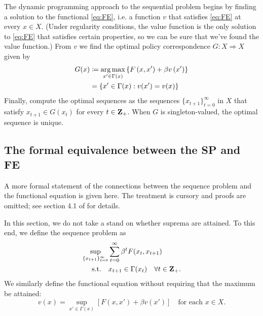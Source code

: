 \documentclass[11pt,letterpaper,reqno,oneside]{article}
\begin{document}
The dynamic programming approach to the sequential problem begins by finding a solution to the functional \cref{eq:FE}, i.e. a function $v$ that satisfies \eqref{eq:FE} at every $x \in X$. (Under regularity conditions, the value function is the only solution to \eqref{eq:FE} that satisfies certain properties, so we can be sure that we've found the value function.) From $v$ we find the optimal policy correspondence $G : X \Rightarrow X$ given by
%
\begin{align}
	G(x)
	&\coloneqq \operatorname*{arg\,max}_{ x' \in \Gamma(x) } 
	\left\{ F \left( x, x' \right) + \beta v \left( x' \right) \right\} 
	\nonumber \\
	&= \left\{ x' \in \Gamma(x) : v(x') = v(x) \right\}
	\label{eq:policy_fn}
\end{align}
%
Finally, compute the optimal sequences as the sequences $\{ x_{t+1} \}_{t=0}^\infty$ in $X$ that satisfy $x_{t+1} \in G( x_t )$ for every $t \in \mathbf{Z}_+$. When $G$ is singleton-valued, the optimal sequence is unique.



\subsection{The formal equivalence between the SP and FE}
\label{sec:23Sep2015:formal_equivalence_of_SP_FE}

A more formal statement of the connections between the sequence problem and the functional equation is given here. The treatment is cursory and proofs are omitted; see section 4.1 of \textcite{StokeyLucasPrescott1989} for details.

In this section, we do not take a stand on whether suprema are attained. To this end, we define the sequence problem as
%
\begin{align}
	\sup_{\{x_{t+1}\}_{t=0}^\infty} 
	&\sum_{t=0}^\infty \beta^t F(x_t,x_{t+1})
	\nonumber\\
	\text{s.t.}\quad
	&x_{t+1} \in \Gamma(x_t) \quad\forall t\in \mathbf{Z}_+ .
	\label{eq:SP_sup}
\end{align}
%
We similarly define the functional equation without requiring that the maximum be attained:
%
\begin{equation}
	v(x)
	= \sup_{ x' \in \Gamma(x) } 
	\left[ F \left( x, x' \right) + \beta v \left( x' \right) \right] 
	\quad\text{for each $x \in X$} .
	\label{eq:FE_sup}
\end{equation}
\end{document}
